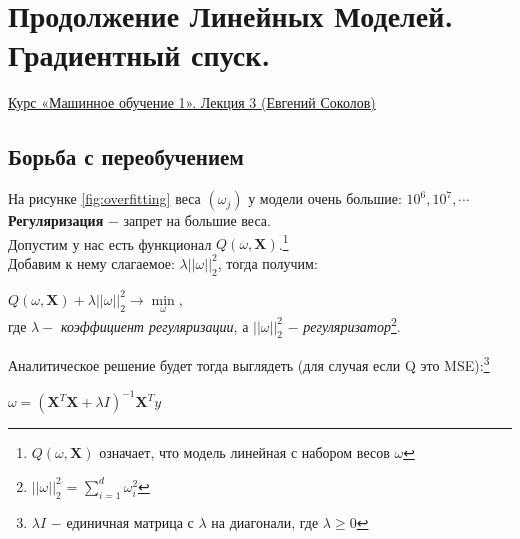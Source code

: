 \newpage
\section{Продолжение Линейных Моделей. Градиентный спуск.}
    \href{https://www.youtube.com/watch?v=Wwg6dU1pX4A&list=PLEqoHzpnmTfChItexxg2ZfxCsm-8QPsdS&index=3}{Курс «Машинное обучение 1». Лекция 3 (Евгений Соколов)}\\

    \subsection{Борьба с переобучением}
        На рисунке \ref{fig:overfitting} веса $(\omega_j)$ у модели очень большие: $10^6, 10^7, \cdots$\\

        \textbf{Регуляризация} $-$ запрет на большие веса.\\

        Допустим у нас есть функционал $Q(\omega, \mathbf{X})$.\footnote{$Q(\omega, \mathbf{X})$ означает, что модель линейная с набором весов $\omega$}\\
        Добавим к нему слагаемое:  $\lambda||\omega||^2_2$, тогда получим:\\
        \begin{center}
            \large{$Q(\omega, \mathbf{X}) + \lambda||\omega||^2_2 \longrightarrow \min\limits_\omega$},\\
            где $\lambda -$ \textit{коэффициент регуляризации}, а $||\omega||^2_2$ $-$ \textit{регуляризатор}\footnote{$||\omega||_2^2$ = $\sum\limits_{i = 1}^d\omega^2_i$}.\\
        \end{center}
        
        Аналитическое решение будет тогда выглядеть (для случая если Q это MSE):\footnote{$\lambda I$ $-$ единичная матрица с $\lambda$ на диагонали, где $\lambda \geq 0$}\\
        \begin{center}
            $\omega = (\mathbf{X}^T\mathbf{X} + \lambda I)^{-1}\mathbf{X}^Ty$
        \end{center}


